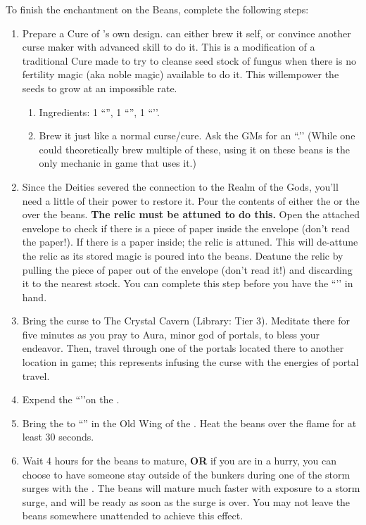 \documentclass[green]{GL2020}
\begin{document}
To finish the enchantment on the Beans, complete the following steps:
\begin{enumerate}
  \item Prepare a Cure of \cCurse{}’s own design. \cCurse{} can either brew it \cCurse{\them}self, or convince another curse maker with advanced skill to do it. This is a modification of a traditional Cure made to try to cleanse seed stock of fungus when there is no fertility magic (aka noble magic) available to do it. This willempower the seeds to grow at an impossible rate.
  \begin{enumerate}
    \item Ingredients: 1 ``\iHollyhock{}'', 1 ``\iBlackCrocus{}'', 1 ``\iClay{}’’.
    \item Brew it just like a normal curse/cure. Ask the GMs for an ``\iEyeOfVulture{}.’’ (While one could theoretically brew multiple of these, using it on these beans is the only mechanic in game that uses it.)
  \end{enumerate}
  \item Since the Deities severed the connection to the Realm of the Gods, you’ll need a little of their power to restore it. Pour the contents of either the \iPitcher{} or the \iChalice{} over the beans. \textbf{The relic must be attuned to do this.} Open the attached envelope to check if there is a piece of paper inside the envelope (don’t read the paper!). If there is a paper inside; the relic is attuned. This will de-attune the relic as its stored magic is poured into the beans. Deatune the relic by pulling the piece of paper out of the envelope (don’t read it!) and discarding it to the nearest stock. You can complete this step before you have the ``\iEyeOfVulture{}’’ in hand.
  \item Bring the curse to The Crystal Cavern (Library: Tier 3). Meditate there for five minutes as you pray to Aura, minor god of portals, to bless your endeavor. Then, travel through one of the portals located there to another location in game; this represents infusing the curse with the energies of portal travel. 
  \item Expend the ``\iEyeOfVulture{}’’on the \iBeansNB{}.  \item Bring the \iBeansNB{} to ``\sPFlameOne{}'' in the Old Wing of the \pSc{}. Heat the beans over the flame for at least 30 seconds.
  \item Wait 4 hours for the beans to mature, \textbf{OR} if you are in a hurry, you can choose to have someone stay outside of the bunkers during one of the storm surges with the \iBeansNB{}. The beans will mature much faster with exposure to a storm surge, and will be ready as soon as the surge is over. You may not leave the beans somewhere unattended to achieve this effect.

\end{enumerate}
\end{document}
